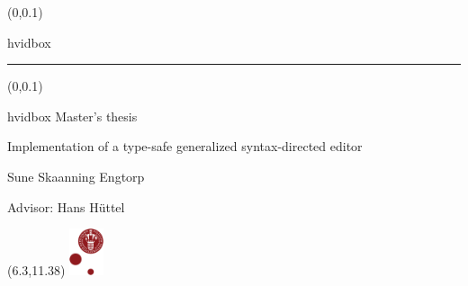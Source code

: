 \documentclass[t,24pt,aspectratio=169]{beamer}
\begin{document}
{
\begin{frame}
    \begin{textblock*}{\textwidth}(0\textwidth,0.1\textheight)
        \begin{beamercolorbox}[wd=7.8cm,ht=7.3cm,sep=0.5cm]{hvidbox}
            \fontsize{5}{10}\selectfont {}
            \noindent\textcolor{KUrod}{\rule{6.8cm}{0.4pt}}
        \end{beamercolorbox}
    \end{textblock*}
    \begin{textblock*}{\textwidth}(0\textwidth,0.1\textheight)
        \begin{beamercolorbox}[wd=7.8cm,sep=0.5cm]{hvidbox}
            \Huge \textcolor{KUrod}{Master's thesis}
            \vspace{0.5cm}
            \par
            \Large Implementation of a type-safe
            generalized syntax-directed editor
            \vspace{0.5cm}
            \par
            \normalsize Sune Skaanning Engtorp
            \vspace{0.3cm}
            \par
            \footnotesize Advisor: Hans Hüttel
        \end{beamercolorbox}
    \end{textblock*}
    \begin{textblock}{1}(6.3,11.38)
        \includegraphics[width=1cm]{KU/KU-logo.png}
    \end{textblock}
\end{frame}
}
\end{document}
